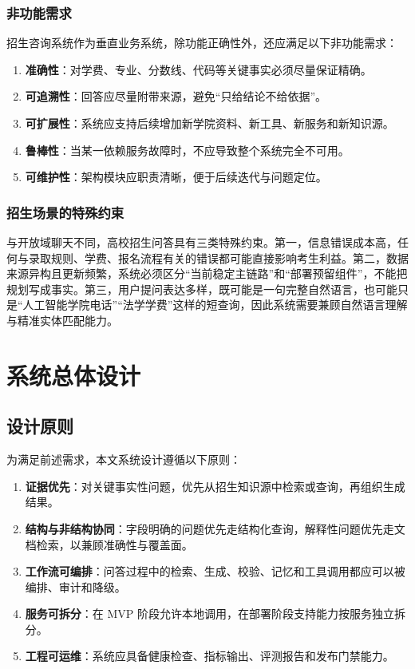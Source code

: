 \documentclass[UTF8,zihao=-4,oneside,fontset=windows]{ctexbook}
\numberwithin{equation}{chapter}
\begin{document}
\subsection{非功能需求}
招生咨询系统作为垂直业务系统，除功能正确性外，还应满足以下非功能需求：

\begin{enumerate}
  \item \textbf{准确性}：对学费、专业、分数线、代码等关键事实必须尽量保证精确。
  \item \textbf{可追溯性}：回答应尽量附带来源，避免“只给结论不给依据”。
  \item \textbf{可扩展性}：系统应支持后续增加新学院资料、新工具、新服务和新知识源。
  \item \textbf{鲁棒性}：当某一依赖服务故障时，不应导致整个系统完全不可用。
  \item \textbf{可维护性}：架构模块应职责清晰，便于后续迭代与问题定位。
\end{enumerate}

\subsection{招生场景的特殊约束}
与开放域聊天不同，高校招生问答具有三类特殊约束。第一，信息错误成本高，任何与录取规则、学费、报名流程有关的错误都可能直接影响考生利益。第二，数据来源异构且更新频繁，系统必须区分“当前稳定主链路”和“部署预留组件”，不能把规划写成事实。第三，用户提问表达多样，既可能是一句完整自然语言，也可能只是“人工智能学院电话”“法学学费”这样的短查询，因此系统需要兼顾自然语言理解与精准实体匹配能力。

\chapter{系统总体设计}

\section{设计原则}
为满足前述需求，本文系统设计遵循以下原则：

\begin{enumerate}
  \item \textbf{证据优先}：对关键事实性问题，优先从招生知识源中检索或查询，再组织生成结果。
  \item \textbf{结构与非结构协同}：字段明确的问题优先走结构化查询，解释性问题优先走文档检索，以兼顾准确性与覆盖面。
  \item \textbf{工作流可编排}：问答过程中的检索、生成、校验、记忆和工具调用都应可以被编排、审计和降级。
  \item \textbf{服务可拆分}：在 MVP 阶段允许本地调用，在部署阶段支持能力按服务独立拆分。
  \item \textbf{工程可运维}：系统应具备健康检查、指标输出、评测报告和发布门禁能力。
\end{enumerate}
\end{document}
